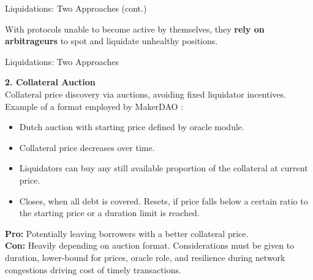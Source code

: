 \documentclass[]{beamer}
\begin{document}
\begin{frame}{Liquidations: Two Approaches (cont.)}

With protocols unable to become active by themselves, they \textbf{rely on arbitrageurs} to spot and liquidate unhealthy positions.


\end{frame}


\begin{frame}{Liquidations: Two Approaches }


\textbf{2. Collateral Auction}\\
\vspace{0.2em}
Collateral price discovery via auctions, avoiding fixed liquidator incentives. Example of a format employed by MakerDAO \cite{MakerDAO}:
\begin{itemize}
\item Dutch auction with starting price defined by oracle module. 
\item Collateral price decreases over time. 
\item Liquidators can buy any still available proportion of the collateral at current price.
\item Closes, when all debt is covered. Resets, if price falls below a certain ratio to the starting price or a duration limit is reached.
\end{itemize}
\vspace{0.5em}

\textbf{Pro:} Potentially leaving borrowers with a better collateral price.\\
\vspace{0.5em}
\textbf{Con:} Heavily depending on auction format. Considerations must be given to duration, lower-bound for  prices, oracle role, and resilience during network congestions driving cost of timely transactions.


	
\end{frame}
\end{document}
